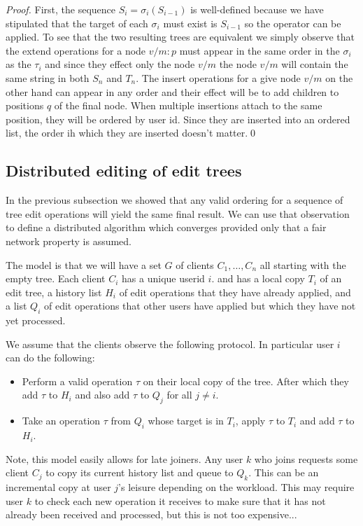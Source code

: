 \documentclass{amsart}
\begin{document}
\begin{proof}
First, the sequence $S_{i}=\sigma_i(S_{i-1})$ is well-defined because we have
stipulated that the target of each $\sigma_i$ must exist is $S_{i-1}$ so the
operator can be applied. To see that the two resulting trees are equivalent
we simply observe that the extend operations for a node $v/m:p$ must appear
in the same order in the $\sigma_i$ as the $\tau_i$ and since they effect only
the node $v/m$ the node $v/m$ will contain the same string in both $S_n$ and $T_n$.
The insert operations for a give node $v/m$ on the other hand can appear
in any order and their effect will be to add children to positions $q$
of the final node. When multiple insertions attach to the same position, they
will be ordered by user id. Since they are inserted into an ordered list,
the order ih which they are inserted doesn't matter.\qed
\end{proof}

\subsection{Distributed editing of edit trees}
In the previous subsection we showed that any valid ordering for a sequence
of tree edit operations will yield the same final result. We can use that
observation to define a distributed algorithm which converges provided only
that a fair network property is assumed.

The model is that we will have a set $G$ of clients $C_1,\ldots,C_n$
all starting with the empty tree. Each client $C_i$ has a unique userid $i$.
and has a local copy $T_i$ of an edit tree,
a history list $H_i$ of edit operations that they have already applied, and
a list $Q_i$ of edit operations that other users have applied but which they
have not yet processed.

We assume that the clients observe the following protocol. 
In particular user $i$ can do the following:
\begin{itemize}
\item Perform a valid operation $\tau$ on their local copy of the tree.
After which they add $\tau$ to $H_i$ and also add $\tau$ to $Q_j$ for
all $j\ne i$.
\item Take an operation $\tau$ from $Q_i$ whose target is in $T_i$, apply
$\tau$ to $T_i$ and add $\tau$ to $H_i$.
\end{itemize}
Note, this model easily allows for late joiners.  Any user $k$ who joins
requests some client $C_j$ to copy its current history list and queue
to $Q_k$. This can be an incremental copy at user $j$'s leisure depending
on the workload.  This may require user $k$ to check each new operation
it receives to make sure that it has not already been received and processed,
but this is not too expensive...
\end{document}
